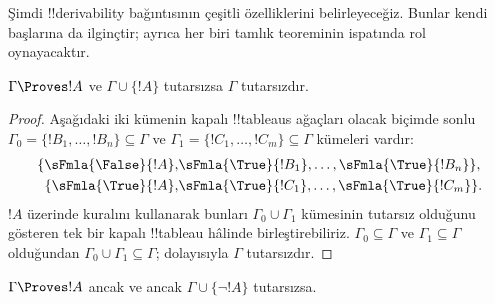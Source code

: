 

      {}
      {}


Şimdi !!{derivability} bağıntısının çeşitli özelliklerini belirleyeceğiz.
Bunlar kendi başlarına da ilginçtir; ayrıca her biri tamlık teoreminin
ispatında rol oynayacaktır.

\begin{prop}
  $\Gamma \Proves !A$ ve $\Gamma \cup \{!A\}$ tutarsızsa $\Gamma$
  tutarsızdır.
\end{prop}

\begin{proof}
Aşağıdaki iki kümenin kapalı !!{tableau}s ağaçları olacak biçimde sonlu
$\Gamma_0 = \{!B_1, \dots, !B_n\} \subseteq \Gamma$ ve
$\Gamma_1 =\{!C_1, \dots, !C_m\} \subseteq \Gamma$ kümeleri vardır:
  \begin{align*}
    \{\sFmla{\False}{!A}, &
    \sFmla{\True}{!B_1}, \dots, \sFmla{\True}{!B_n}\}, \\
    \{\sFmla{\True}{!A}, &
    \sFmla{\True}{!C_1}, \dots, \sFmla{\True}{!C_m}\}.
  \end{align*}
  $!A$ üzerinde \Cut{} kuralını kullanarak bunları $\Gamma_0
  \cup \Gamma_1$ kümesinin tutarsız olduğunu gösteren tek bir kapalı
  !!{tableau} hâlinde birleştirebiliriz. $\Gamma_0 \subseteq \Gamma$ ve
  $\Gamma_1 \subseteq \Gamma$ olduğundan $\Gamma_0 \cup
  \Gamma_1 \subseteq \Gamma$; dolayısıyla $\Gamma$ tutarsızdır.
\end{proof}

\begin{prop}
$\Gamma \Proves !A$ ancak ve ancak $\Gamma \cup \{\lnot !A\}$ tutarsızsa.
\end{prop}

